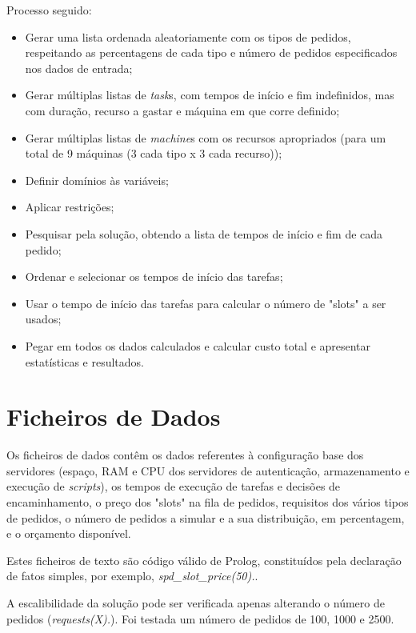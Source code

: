 \documentclass{llncs}
\begin{document}
Processo seguido:
\begin{itemize}
  \item Gerar uma lista ordenada aleatoriamente com os tipos de pedidos, respeitando as percentagens de cada tipo e número de pedidos especificados nos dados de entrada;
  \item Gerar múltiplas listas de \textit{task}s, com tempos de início e fim indefinidos, mas com duração, recurso a gastar e máquina em que corre definido;
  \item Gerar múltiplas listas de \textit{machine}s com os recursos apropriados (para um total de 9 máquinas (3 cada tipo x 3 cada recurso));
  \item Definir domínios às variáveis;
  \item Aplicar restrições;
  \item Pesquisar pela solução, obtendo a lista de tempos de início e fim de cada pedido;
  \item Ordenar e selecionar os tempos de início das tarefas;
  \item Usar o tempo de início das tarefas para calcular o número de "slots" a ser usados;
  \item Pegar em todos os dados calculados e calcular custo total e apresentar estatísticas e resultados.
\end{itemize}

\section{Ficheiros de Dados}\label{sec:Data Files}

Os ficheiros de dados contêm os dados referentes à configuração base dos servidores (espaço, RAM e CPU dos servidores de autenticação, armazenamento e execução de \textit{scripts}), os tempos de execução de tarefas e decisões de encaminhamento, o preço dos "slots" na fila de pedidos, requisitos dos vários tipos de pedidos, o número de pedidos a simular e a sua distribuição, em percentagem, e o orçamento disponível.


Estes ficheiros de texto são código válido de Prolog, constituídos pela declaração de fatos simples, por exemplo, \textit{spd\_slot\_price(50).}.


A escalibilidade da solução pode ser verificada apenas alterando o número de pedidos (\textit{requests(X).}). Foi testada um número de pedidos de 100, 1000 e 2500.
\end{document}
